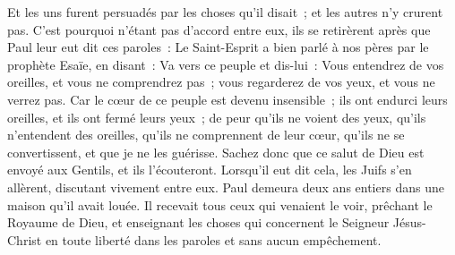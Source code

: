 \begin{multicols}{2}
Et les uns furent persuadés par les choses qu'il disait~; et les autres n'y crurent pas.
C'est pourquoi n'étant pas d'accord entre eux, ils se retirèrent après que Paul leur eut dit ces paroles~: Le Saint-Esprit a bien parlé à nos pères par le prophète Esaïe, en disant~:
Va vers ce peuple et dis-lui~: Vous entendrez de vos oreilles, et vous ne comprendrez pas~; vous regarderez de vos yeux, et vous ne verrez pas.
Car le cœur de ce peuple est devenu insensible~; ils ont endurci leurs oreilles, et ils ont fermé leurs yeux~; de peur qu'ils ne voient des yeux, qu'ils n'entendent des oreilles, qu'ils ne comprennent de leur cœur, qu'ils ne se convertissent, et que je ne les guérisse.
Sachez donc que ce salut de Dieu est envoyé aux Gentils, et ils l'écouteront.
Lorsqu'il eut dit cela, les Juifs s'en allèrent, discutant vivement entre eux.
Paul demeura deux ans entiers dans une maison qu'il avait louée. Il recevait tous ceux qui venaient le voir,
prêchant le Royaume de Dieu, et enseignant les choses qui concernent le Seigneur Jésus-Christ en toute liberté dans les paroles et sans aucun empêchement.
\PPE{}
\end{multicols}
